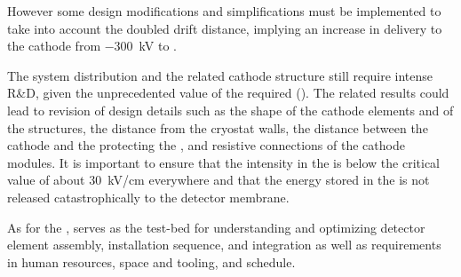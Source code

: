 However some design modifications and simplifications must be implemented to take into account the %
doubled drift distance, implying an increase in  delivery to the cathode from \SI{-300}{\kV} to \dptargetdriftvoltneg{}.

The \dual {} system distribution and the related cathode structure still require intense R\&D, given the unprecedented value of the required  (\dptargetdriftvoltneg).
The related results could lead to revision of design details such as the shape of the cathode elements and of the %
 structures, the distance from the cryostat walls, the distance between the cathode and the %
 protecting the , and resistive connections of the cathode modules. It is important to ensure that the \efield intensity in the \lar is below the critical value of  about \SI{30}{\kV/\cm} everywhere and that the energy stored in the  is not  released catastrophically to the detector membrane. %

As for the ,  serves as the test-bed for understanding and optimizing detector element assembly, installation sequence, and integration as well as requirements in %
human resources, space and tooling, and schedule. 



%
%
%
